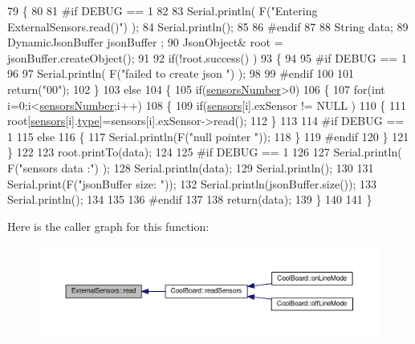 \begin{DoxyCode}
79 \{
80 
81 \textcolor{preprocessor}{#if DEBUG == 1}
82 
83     Serial.println( F(\textcolor{stringliteral}{"Entering ExternalSensors.read()"}) );
84     Serial.println();
85 
86 \textcolor{preprocessor}{#endif }
87 
88     String data;
89     DynamicJsonBuffer  jsonBuffer ;
90     JsonObject& root = jsonBuffer.createObject();
91 
92     \textcolor{keywordflow}{if}(!root.success() )
93     \{
94  
95 \textcolor{preprocessor}{    #if DEBUG == 1}
96 
97         Serial.println( F(\textcolor{stringliteral}{"failed to create json "}) );
98     
99 \textcolor{preprocessor}{    #endif }
100 
101         \textcolor{keywordflow}{return}(\textcolor{stringliteral}{"00"});
102     \}
103     \textcolor{keywordflow}{else}
104     \{
105         \textcolor{keywordflow}{if}(\hyperlink{class_external_sensors_a58e4fbf9adeae787d92be5fa33043b5d}{sensorsNumber}>0)
106         \{
107             \textcolor{keywordflow}{for}(\textcolor{keywordtype}{int} i=0;i<\hyperlink{class_external_sensors_a58e4fbf9adeae787d92be5fa33043b5d}{sensorsNumber};i++)
108             \{
109                 \textcolor{keywordflow}{if}(\hyperlink{class_external_sensors_a284233f884fcf00154a44740cf1d9e1e}{sensors}[i].exSensor != NULL )
110                 \{
111                     root[\hyperlink{class_external_sensors_a284233f884fcf00154a44740cf1d9e1e}{sensors}[i].\hyperlink{struct_external_sensors_1_1sensor_a6acfdb02c742c2110d7bd2b5d9fce9e7}{type}]=sensors[i].exSensor->read();       
112                 \}
113             
114 \textcolor{preprocessor}{            #if DEBUG == 1}
115                 \textcolor{keywordflow}{else}
116                 \{
117                     Serial.println(F(\textcolor{stringliteral}{"null pointer "}));
118                 \}
119 \textcolor{preprocessor}{            #endif  }
120             \}
121         \}   
122         
123         root.printTo(data);
124     
125 \textcolor{preprocessor}{    #if DEBUG == 1}
126 
127         Serial.println( F(\textcolor{stringliteral}{"sensors data :"}) );
128         Serial.println(data);
129         Serial.println();
130 
131         Serial.print(F(\textcolor{stringliteral}{"jsonBuffer size: "}));
132         Serial.println(jsonBuffer.size());
133         Serial.println();
134 
135     
136 \textcolor{preprocessor}{    #endif}
137     
138         \textcolor{keywordflow}{return}(data);
139     \}
140 
141 \}
\end{DoxyCode}
Here is the caller graph for this function\+:\nopagebreak
\begin{figure}[H]
\begin{center}
\leavevmode
\includegraphics[width=350pt]{d1/d2f/class_external_sensors_a53177b81eca3be89508b5511ddcd00fc_icgraph}
\end{center}
\end{figure}


